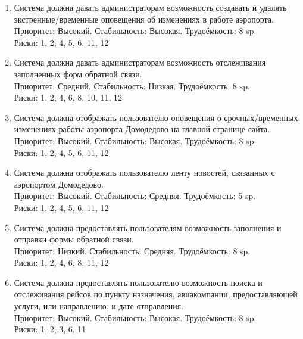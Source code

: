 \begin{enumerate}
      \item Система должна давать администраторам возможность
            создавать и удалять экстренные/временные
            оповещения об изменениях в работе аэропорта. \\
            Приоритет: Высокий. Стабильность: Высокая. Трудоёмкость: 8 sp.\\
            Риски: 1, 2, 4, 5, 6, 11, 12

      \item Система должна давать администраторам возможность
            отслеживания заполненных форм обратной связи. \\
            Приоритет: Средний. Стабильность: Низкая. Трудоёмкость: 8 sp.\\
            Риски: 1, 2, 4, 6, 8, 10, 11, 12

      \item Система должна отображать пользователю оповещения о
            срочных/временных изменениях работы аэропорта
            Домодедово на главной странице сайта. \\
            Приоритет: Высокий. Стабильность: Высокая. Трудоёмкость: 8 sp.\\
            Риски: 1, 2, 4, 5, 6, 11, 12

      \item Система должна отображать пользователю ленту
            новостей, связанных с аэропортом Домодедово. \\
            Приоритет: Высокий. Стабильность: Средняя. Трудоёмкость: 5 sp.\\
            Риски: 1, 2, 4, 5, 6, 11, 12

      \item Система должна предоставлять пользователям возможность заполнения
            и отправки формы обратной связи. \\
            Приоритет: Низкий. Стабильность: Средняя. Трудоёмкость: 8 sp.\\
            Риски: 1, 2, 4, 6, 8, 11, 12

      \item Система должна предоставлять пользователю возможность поиска
            и отслеживания рейсов по пункту назначения,
            авиакомпании, предоставляющей услуги, или
            направлению, и дате отправления. \\
            Приоритет: Высокий. Стабильность: Высокая. Трудоёмкость: 8 sp.\\
            Риски: 1, 2, 3, 6, 11


\end{enumerate}
